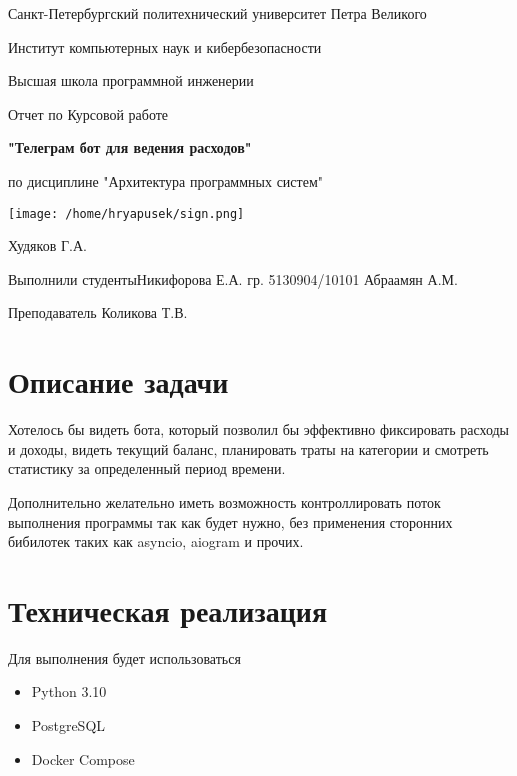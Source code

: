 \documentclass[12pt]{extarticle}
\begin{document}
\thispagestyle{empty}
\begin{center}
    Санкт-Петербургский политехнический университет Петра Великого\par
    Институт компьютерных наук и кибербезопасности\par
    Высшая школа программной инженерии
\end{center}
\hspace{0pt}
\vfill
\begin{center}
    {\huge Отчет по Курсовой работе\par}
    {\Large \bfseries{"Телеграм бот для ведения расходов"}\par}
    по дисциплине "Архитектура программных систем"\par
    \vfill
\end{center}
\hfill\texttt{[image: /home/hryapusek/sign.png]}\par
{\raggedleft Худяков Г.А.\par}
\noindent Выполнили студенты\hfill Никифорова Е.А.\newline
гр. 5130904/10101 \hfill Абраамян А.М.\par
\hfill \break
\hfill \break
\hfill \break
Преподаватель \hfill Коликова Т.В.

\pagebreak

\renewcommand*\contentsname{Содержание}
\tableofcontents

\pagebreak
\section{Описание задачи}
Хотелось бы видеть бота, который позволил бы эффективно фиксировать расходы и доходы, видеть текущий баланс, планировать траты на категории и смотреть статистику за определенный период времени.

Дополнительно желательно иметь возможность контроллировать поток выполнения программы так как будет нужно, без применения сторонних бибилотек таких как asyncio, aiogram и прочих.

\pagebreak

\section{Техническая реализация}
Для выполнения будет использоваться
\begin{itemize}
    \item Python 3.10
    \item PostgreSQL
    \item Docker Compose
\end{itemize}
\end{document}
